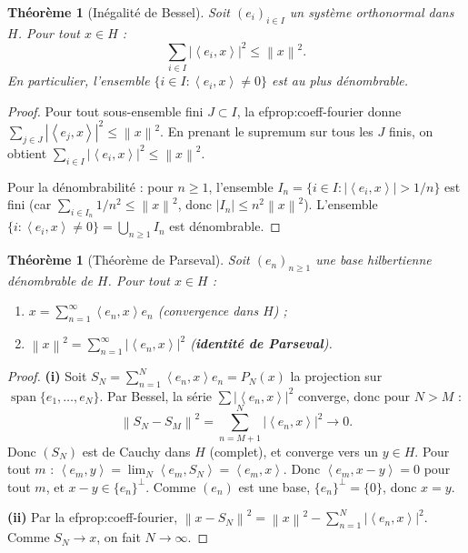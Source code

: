 \documentclass[a4paper,12pt]{book}
\DeclareMathOperator{\spn}{span}
\newcommand{\norm}[1]{\left\| #1 \right\|}
\newcommand{\abs}[1]{\left| #1 \right|}
\newcommand{\inner}[2]{\left\langle #1, #2 \right\rangle}
\theoremstyle{definition}
\theoremstyle{plain}
\newtheorem{theoreme}[definition]{Théorème}
\theoremstyle{remark}
\begin{document}
\begin{theoreme}[Inégalité de Bessel]\label{thm:bessel}
Soit $(e_i)_{i \in I}$ un système orthonormal dans $H$. Pour tout $x \in H$ :
\[
    \sum_{i \in I} \abs{\inner{e_i}{x}}^2 \leq \norm{x}^2.
\]
En particulier, l'ensemble $\{i \in I : \inner{e_i}{x} \neq 0\}$ est au plus dénombrable.
\end{theoreme}

\begin{proof}
Pour tout sous-ensemble fini $J \subset I$, la 
ef{prop:coeff-fourier} donne $\sum_{j \in J}\abs{\inner{e_j}{x}}^2 \leq \norm{x}^2$. En prenant le supremum sur tous les $J$ finis, on obtient $\sum_{i \in I}\abs{\inner{e_i}{x}}^2 \leq \norm{x}^2$.

Pour la dénombrabilité : pour $n \geq 1$, l'ensemble $I_n = \{i \in I : \abs{\inner{e_i}{x}} > 1/n\}$ est fini (car $\sum_{i \in I_n} 1/n^2 \leq \norm{x}^2$, donc $\abs{I_n} \leq n^2\norm{x}^2$). L'ensemble $\{i : \inner{e_i}{x} \neq 0\} = \bigcup_{n\geq 1} I_n$ est dénombrable.
\end{proof}

\begin{theoreme}[Théorème de Parseval]\label{thm:parseval}
Soit $(e_n)_{n \geq 1}$ une base hilbertienne dénombrable de $H$. Pour tout $x \in H$ :
\begin{enumerate}[label=(\roman*)]
    \item $x = \sum_{n=1}^{\infty} \inner{e_n}{x} e_n$ \quad (convergence dans $H$) ;
    \item $\norm{x}^2 = \sum_{n=1}^{\infty} \abs{\inner{e_n}{x}}^2$ \quad (\textbf{identité de Parseval}).
\end{enumerate}
\end{theoreme}

\begin{proof}
\textbf{(i)} Soit $S_N = \sum_{n=1}^{N}\inner{e_n}{x}e_n = P_N(x)$ la projection sur $\spn\{e_1, \ldots, e_N\}$. Par Bessel, la série $\sum\abs{\inner{e_n}{x}}^2$ converge, donc pour $N > M$ :
\[
    \norm{S_N - S_M}^2 = \sum_{n=M+1}^{N}\abs{\inner{e_n}{x}}^2 \to 0.
\]
Donc $(S_N)$ est de Cauchy dans $H$ (complet), et converge vers un $y \in H$. Pour tout $m$ : $\inner{e_m}{y} = \lim_N \inner{e_m}{S_N} = \inner{e_m}{x}$. Donc $\inner{e_m}{x - y} = 0$ pour tout $m$, et $x - y \in \{e_n\}^\perp$. Comme $(e_n)$ est une base, $\{e_n\}^\perp = \{0\}$, donc $x = y$.

\textbf{(ii)} Par la 
ef{prop:coeff-fourier}, $\norm{x - S_N}^2 = \norm{x}^2 - \sum_{n=1}^N \abs{\inner{e_n}{x}}^2$. Comme $S_N \to x$, on fait $N \to \infty$.
\end{proof}
\end{document}
